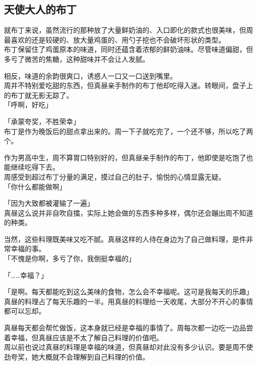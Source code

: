 \subsection{天使大人的布丁}

就布丁来说，虽然流行的那种放了大量鲜奶油的、入口即化的款式也很美味，但周最喜欢的还是较硬的、放大量鸡蛋的、用勺子挖也不会破坏形状的类型。\\

布丁保留住了鸡蛋原本的味道，同时还蕴含着浓郁的鲜奶油味。尽管味道偏甜，但多亏了微苦的焦糖，这种甜味并不会让人发腻。

相反，味道的余韵很爽口，诱惑人一口又一口送到嘴里。\\

周并不特别爱吃甜的东西，但真昼亲手制作的布丁他却吃得入迷。转眼间，盘子上的布丁就无影无踪了。\\

「呼啊，好吃」

「承蒙夸奖，不胜荣幸」\\

布丁是作为晚饭后的甜点拿出来的。周一下子就吃完了，一个还不够，所以吃了两个。

作为男高中生，周不算胃口特别好的，但真昼亲手制作的布丁，他即使是吃饱了也能继续吃得下去。\\

周感受到超过布丁分量的满足，摸过自己的肚子，愉悦的心情显露无疑。\\

「你什么都能做啊」

「因为大致都被灌输了一遍」\\

真昼这么说并非自吹自擂，实际上她会做的东西多种多样，偶尔还会蹦出周不知道的种类。

当然，这些料理既美味又吃不腻。真昼这样的人待在身边为了自己做料理，是件非常幸福的事。\\

「不愧是你啊，多亏了你，我倒挺幸福的」

「……幸福？」

「是啊。每天都能吃到这么美味的食物，怎么会不幸福呢。这可是我每天的乐趣」\\

真昼的料理占了每天乐趣的一半。用真昼的料理给一天收尾，大部分不开心的事情都可以忘却。

真昼每天都会帮忙做饭，这本身就已经是幸福的事情了。周每次都一边吃一边品尝着幸福，但真昼应该是不太了解自己料理的价值吧。\\

周以前也说过真昼的料理是幸福的味道，但真昼却对此没有多少认识。要是周不使劲夸奖，她大概就不会理解到自己料理的价值。

